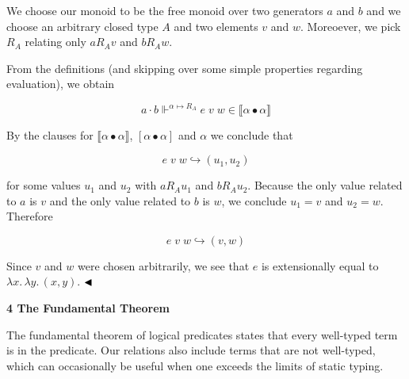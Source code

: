  
We choose our monoid to be the free monoid over two generators $a$ and $b$ and we choose an arbitrary closed type $A$ and two elements $v$ and $w$. Moreoever, we pick $R_{A}$ relating only $a\mathrel{R_{A}}v$ and $b\mathrel{R_{A}}w$.\par
 
 
 
From the definitions (and skipping over some simple properties regarding evaluation), we obtain\par
  
\par  \quad  \[a\cdot b\Vdash^{\alpha\mapsto R_{A}}e\;v\;w\in\llbracket\alpha\bullet\alpha\rrbracket\]\quad  \quad  
  
By the clauses for $\llbracket\alpha\bullet\alpha\rrbracket$, $[\alpha\bullet\alpha]$ and $\alpha$ we conclude that\par
  
\par  \quad  \[e\;v\;w\mathrel{\hookrightarrow}(u_{1},u_{2})\]\quad  \quad  
  
for some values $u_{1}$ and $u_{2}$ with $a\mathrel{R_{A}}u_{1}$ and $b\mathrel{R_{A}}u_{2}$. Because the only value related to $a$ is $v$ and the only value related to $b$ is $w$, we conclude $u_{1}=v$ and $u_{2}=w$. Therefore\par
  
\par  \quad  \[e\;v\;w\mathrel{\hookrightarrow}(v,w)\]\quad  \quad  
  
Since $v$ and $w$ were chosen arbitrarily, we see that $e$ is extensionally equal to $\lambda x.\,\lambda y.\,(x,y)$. $\hfill\blacktriangleleft$\par
 
 
 


 
\par\medskip\noindent\textbf{4 The Fundamental Theorem}\par
 
 
The fundamental theorem of logical predicates states that every well-typed term is in the predicate. Our relations also include terms that are not well-typed, which can occasionally be useful when one exceeds the limits of static typing.\par
 
